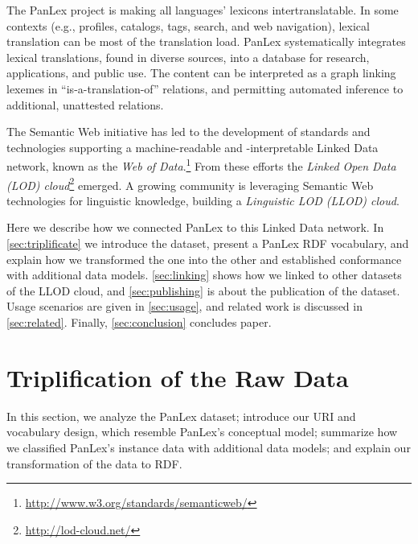 \documentclass[sw]{iosart2c}
\begin{document}
The PanLex project is making all languages' lexicons intertranslatable. In some contexts (e.g., profiles, catalogs, tags, search, and web navigation), lexical translation can be most of the translation load. PanLex systematically integrates lexical translations, found in diverse sources, into a database for research, applications, and public use. The content can be interpreted as a graph linking lexemes in ``is-a-translation-of'' relations, and permitting automated inference to additional, unattested relations.

The Semantic Web initiative has led to the development of standards and technologies
supporting a machine-readable and \mbox{-i}nter\-pretable Linked Data
network, known as the \emph{Web of Data}.\footnote{\url{http://www.w3.org/standards/semanticweb/}} From these efforts the \emph{Linked Open Data (LOD) cloud}\footnote{\url{http://lod-cloud.net/}} emerged.
A growing community is leveraging Semantic Web technologies for linguistic knowledge, building a \emph{Linguistic LOD (LLOD) cloud}.

Here we describe how we connected PanLex to this Linked Data network.
In \autoref{sec:triplificate} we introduce the dataset, present a
PanLex RDF vocabulary, and explain how we transformed the one into the other and established conformance with additional data models.
\autoref{sec:linking} shows how we linked to other datasets of the LLOD cloud,
and \autoref{sec:publishing} is about the publication of the dataset.
Usage scenarios are given in \autoref{sec:usage}, and related work is discussed in \autoref{sec:related}.
Finally, \autoref{sec:conclusion} concludes paper.

\section{Triplification of the Raw Data}
\label{sec:triplificate}
In this section, we analyze the PanLex dataset; introduce our URI and vocabulary design, which resemble PanLex's conceptual model;
summarize how we classified PanLex's instance data with additional data models; and explain our transformation of the data to RDF.
\end{document}
